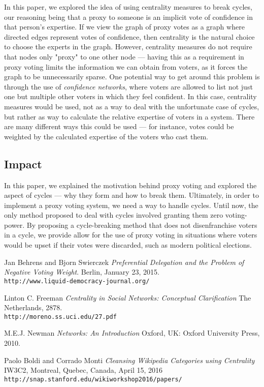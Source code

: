 \documentclass[10pt]{article}
\theoremstyle{definition}
\begin{document}
In this paper, we explored the idea of using centrality measures to break cycles, our reasoning being that a proxy to someone is an implicit vote of confidence in that person's expertise. If we view the graph of proxy votes as a graph where directed edges represent votes of confidence, then centrality is the natural choice to choose the experts in the graph. However, centrality measures do not require that nodes only "proxy" to one other node --- having this as a requirement in proxy voting limits the information we can obtain from voters, as it forces the graph to be unnecessarily sparse. One potential way to get around this problem is through the use of \textit{confidence networks}, where voters are allowed to list not just one but multiple other voters in which they feel confident. In this case, centrality measures would be used, not as a way to deal with the unfortunate case of cycles, but rather as way to calculate the relative expertise of voters in a system. There are many different ways this could be used --- for instance, votes could be weighted by the calculated expertise of the voters who cast them.

\subsection{Impact}
In this paper, we explained the motivation behind proxy voting and explored the aspect of cycles --- why they form and how to break them. Ultimately, in order to implement a proxy voting system, we need a way to handle cycles. Until now, the only method proposed to deal with cycles involved granting them zero voting-power. By proposing a cycle-breaking method that does not disenfranchise voters in a cycle, we provide allow for the use of proxy voting in situations where voters would be upset if their votes were discarded, such as modern political elections.

\begin{thebibliography}{9}
Jan Behrens and Bjorn Swierczek
\textit{Preferential Delegation and the Problem of Negative Voting Weight}. 
Berlin, January 23, 2015.
\\\texttt{http://www.liquid-democracy-journal.org/}


Linton C. Freeman
\textit{Centrality in Social Networks: Conceptual Clarification}
The Netherlands, 2878.
\\\texttt{http://moreno.ss.uci.edu/27.pdf}

M.E.J. Newman
\textit{Networks: An Introduction}
Oxford, UK: Oxford University Press, 2010.

Paolo Boldi and Corrado Monti
\textit{Cleansing Wikipedia Categories using Centrality}
IW3C2, Montreal, Quebec, Canada, April 15, 2016
\\\texttt{http://snap.stanford.edu/wikiworkshop2016/papers/}

\end{thebibliography}
\end{document}
